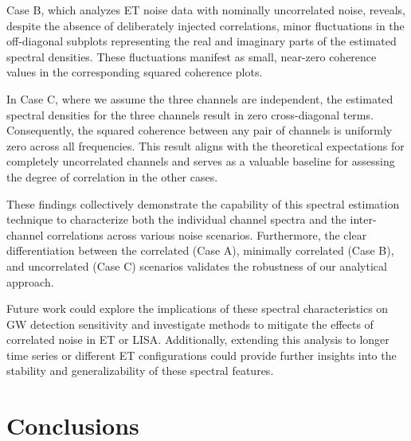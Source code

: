 \documentclass[%
 reprint,
 amsmath,amssymb,
 aps,
 nofootinbib,
]{revtex4-2}
\begin{document}
Case B, which analyzes ET noise data with nominally uncorrelated noise, reveals, despite the absence of deliberately injected correlations, minor fluctuations in the off-diagonal subplots representing the real and imaginary parts of the estimated spectral densities. 
These fluctuations manifest as small, near-zero coherence values in the corresponding squared coherence plots. 
 


In Case C, where we assume the three channels are independent, the estimated spectral densities for the three channels result in zero cross-diagonal terms. 
Consequently, the squared coherence between any pair of channels is uniformly zero across all frequencies. 
This result aligns with the theoretical expectations for completely uncorrelated channels and serves as a valuable baseline for assessing the degree of correlation in the other cases.

These findings collectively demonstrate the capability of this spectral estimation technique to characterize both the individual channel spectra and the inter-channel correlations across various noise scenarios. 
Furthermore, the clear differentiation between the correlated (Case A), minimally correlated (Case B), and uncorrelated (Case C) scenarios validates the robustness of our analytical approach.

Future work could explore the implications of these spectral characteristics on GW detection sensitivity and investigate methods to mitigate the effects of correlated noise in ET or LISA. 
Additionally, extending this analysis to longer time series or different ET configurations could provide further insights into the stability and generalizability of these spectral features.







\section{Conclusions}
\label{sec:Discussion}
\end{document}
